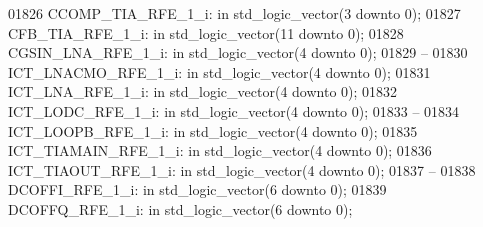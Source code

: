 \begin{DoxyCode}
01826     CCOMP\_TIA\_RFE\_1\_i:  \textcolor{keywordflow}{in} \textcolor{comment}{std\_logic\_vector}(\textcolor{vhdllogic}{}\textcolor{vhdllogic}{3} \textcolor{keywordflow}{downto} \textcolor{vhdllogic}{}\textcolor{vhdllogic}{0});
01827     CFB\_TIA\_RFE\_1\_i:    \textcolor{keywordflow}{in} \textcolor{comment}{std\_logic\_vector}(\textcolor{vhdllogic}{}\textcolor{vhdllogic}{11} \textcolor{keywordflow}{downto} \textcolor{vhdllogic}{}\textcolor{vhdllogic}{0});
01828     CGSIN\_LNA\_RFE\_1\_i:  \textcolor{keywordflow}{in} \textcolor{comment}{std\_logic\_vector}(\textcolor{vhdllogic}{}\textcolor{vhdllogic}{4} \textcolor{keywordflow}{downto} \textcolor{vhdllogic}{}\textcolor{vhdllogic}{0});
01829 \textcolor{keyword}{    --}
01830     ICT\_LNACMO\_RFE\_1\_i: \textcolor{keywordflow}{in} \textcolor{comment}{std\_logic\_vector}(\textcolor{vhdllogic}{}\textcolor{vhdllogic}{4} \textcolor{keywordflow}{downto} \textcolor{vhdllogic}{}\textcolor{vhdllogic}{0});
01831     ICT\_LNA\_RFE\_1\_i:    \textcolor{keywordflow}{in} \textcolor{comment}{std\_logic\_vector}(\textcolor{vhdllogic}{}\textcolor{vhdllogic}{4} \textcolor{keywordflow}{downto} \textcolor{vhdllogic}{}\textcolor{vhdllogic}{0});
01832     ICT\_LODC\_RFE\_1\_i:   \textcolor{keywordflow}{in} \textcolor{comment}{std\_logic\_vector}(\textcolor{vhdllogic}{}\textcolor{vhdllogic}{4} \textcolor{keywordflow}{downto} \textcolor{vhdllogic}{}\textcolor{vhdllogic}{0});
01833 \textcolor{keyword}{    --}
01834     ICT\_LOOPB\_RFE\_1\_i:  \textcolor{keywordflow}{in} \textcolor{comment}{std\_logic\_vector}(\textcolor{vhdllogic}{}\textcolor{vhdllogic}{4} \textcolor{keywordflow}{downto} \textcolor{vhdllogic}{}\textcolor{vhdllogic}{0});
01835     ICT\_TIAMAIN\_RFE\_1\_i:    \textcolor{keywordflow}{in} \textcolor{comment}{std\_logic\_vector}(\textcolor{vhdllogic}{}\textcolor{vhdllogic}{4} \textcolor{keywordflow}{downto} \textcolor{vhdllogic}{}\textcolor{vhdllogic}{0});
01836     ICT\_TIAOUT\_RFE\_1\_i: \textcolor{keywordflow}{in} \textcolor{comment}{std\_logic\_vector}(\textcolor{vhdllogic}{}\textcolor{vhdllogic}{4} \textcolor{keywordflow}{downto} \textcolor{vhdllogic}{}\textcolor{vhdllogic}{0});
01837 \textcolor{keyword}{    --}
01838     DCOFFI\_RFE\_1\_i: \textcolor{keywordflow}{in} \textcolor{comment}{std\_logic\_vector}(\textcolor{vhdllogic}{}\textcolor{vhdllogic}{6} \textcolor{keywordflow}{downto} \textcolor{vhdllogic}{}\textcolor{vhdllogic}{0});
01839     DCOFFQ\_RFE\_1\_i: \textcolor{keywordflow}{in} \textcolor{comment}{std\_logic\_vector}(\textcolor{vhdllogic}{}\textcolor{vhdllogic}{6} \textcolor{keywordflow}{downto} \textcolor{vhdllogic}{}\textcolor{vhdllogic}{0});

\end{DoxyCode}
